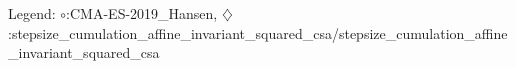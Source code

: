 Legend: {\color{CornflowerBlue}$\circ$}:CMA-ES-2019\_Hansen, {\color{Orange}$\diamondsuit$}:stepsize\_cumulation\_affine\_invariant\_squared\_csa/stepsize\_cumulation\_affine\_invariant\_squared\_csa